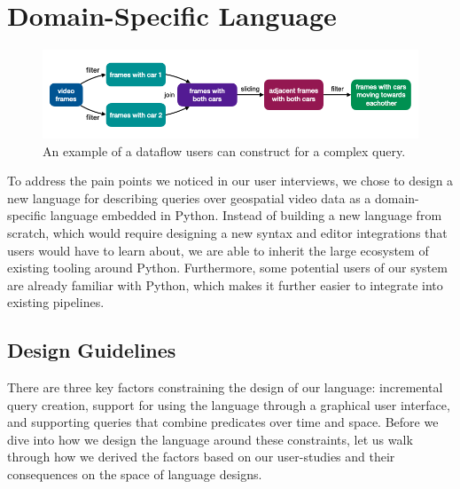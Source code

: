 
\section{Domain-Specific Language}
\begin{figure}[t]
    \centering
    \includegraphics[width=\textwidth]{figures/declarative-dataflow.png}
    \caption{An example of a dataflow users can construct for a complex query.}
    \label{fig:declarative_dataflow}
\end{figure}

To address the pain points we noticed in our user interviews, we chose to design a new language for describing queries over geospatial video data as a domain-specific language embedded in Python. Instead of building a new language from scratch, which would require designing a new syntax and editor integrations that users would have to learn about, we are able to inherit the large ecosystem of existing tooling around Python. Furthermore, some potential users of our system are already familiar with Python, which makes it further easier to integrate into existing pipelines.

\subsection{Design Guidelines}
There are three key factors constraining the design of our language: incremental query creation, support for using the language through a graphical user interface, and supporting queries that combine predicates over time and space. Before we dive into how we design the language around these constraints, let us walk through how we derived the factors based on our user-studies and their consequences on the space of language designs.

